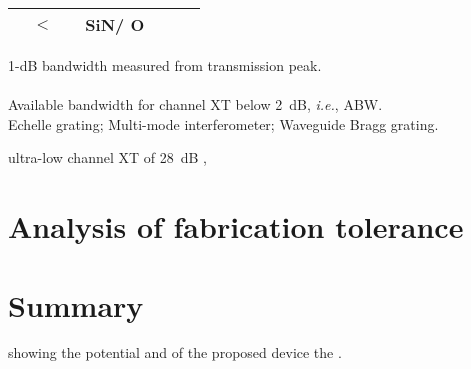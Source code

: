 \begin{table}[!tb]
\begin{tabular}{|M{.7in}|M{.5in}|M{.5in}|M{.3in}|M{.45in}|M{.6in}|M{.6in}|}
             & 
                    $<$  &  & SiN/ O &  &  &  \\ \hline
		\end{tabular}
        \begin{flushleft}
			 1-dB bandwidth measured from  transmission peak.\\	
			\\	
			 Available bandwidth for channel XT below 2~dB, \textit{i.e.}, ABW.\\	
			 Echelle grating;  Multi-mode interferometer;  Waveguide Bragg grating. \\
		\end{flushleft}
	\end{table}
      ultra-low channel XT of 28~dB , 

\section{Analysis of fabrication tolerance} \label{sec:4.2}
    \lipsum
    
    \lipsum

\section{Summary} \label{sec:4.3}
    \lipsum 
    showing the  potential and   of the proposed device  the 
    .
